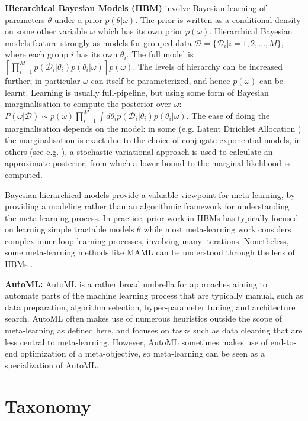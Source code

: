 \documentclass[10pt,journal,compsoc]{IEEEtran}
\newcommand{\keypoint}[1]{\vspace{0.1cm}\noindent\textbf{#1}\quad}
\begin{document}
\keypoint{Hierarchical Bayesian Models (HBM)}
\label{sect:hbm}
involve Bayesian learning of parameters $\theta$ under a prior $p(\theta|\omega)$. The prior is written
as a conditional density on some other variable $\omega$ which has its own prior $p(\omega)$. Hierarchical Bayesian models feature strongly as models for grouped data $\mathcal{D}=\{\mathcal{D}_i|i=1,2,\ldots,M\}$, where each group $i$ has its own $\theta_i$. The full model is $\left[\prod_{i=1}^M p(\mathcal{D}_i|\theta_i)p(\theta_i|\omega)\right]p(\omega)$. The levels of hierarchy can be increased further; in particular $\omega$ can itself be parameterized, and hence $p(\omega)$ can be learnt. Learning is usually full-pipeline, but using some form of Bayesian marginalisation to compute the posterior over $\omega$: $P(\omega|\mathcal{D}) \sim p(\omega)\prod_{i=1}^M \int d\theta_i p(\mathcal{D}_i|\theta_i)p(\theta_i|\omega)$. The ease of doing the marginalisation depends on the model: in some (e.g. Latent Dirichlet Allocation \cite{blei2003lda}) the marginalisation is exact due to the choice of conjugate exponential models, in others (see e.g. \cite{edwards2016neuralstat}), a stochastic variational approach is used to calculate an approximate posterior, from which a lower bound to the marginal likelihood is computed.

Bayesian hierarchical models provide a valuable viewpoint for meta-learning, by providing a modeling rather than an algorithmic framework for understanding the meta-learning process. In practice, prior work in HBMs has typically focused on learning simple tractable models $\theta$ while most meta-learning work considers complex inner-loop learning processes, involving many iterations. Nonetheless, some meta-learning methods like MAML \cite{finn2017maml} can be understood through the lens of HBMs \cite{grant2018bayesmaml}.

\keypoint{AutoML:} AutoML \cite{yao2018automl,vanschoren2018metasurvey,hutter2019autoMLbook} is a rather broad umbrella for approaches aiming to automate parts of the machine learning process that are typically manual, such as data preparation, algorithm selection, hyper-parameter tuning, and architecture search. AutoML often makes use of numerous heuristics outside the scope of meta-learning as defined here, and focuses on tasks such as data cleaning that are less central to meta-learning. However, AutoML sometimes makes use of end-to-end optimization of a meta-objective, so meta-learning can be seen as a specialization of AutoML.


\section{Taxonomy}
\end{document}
